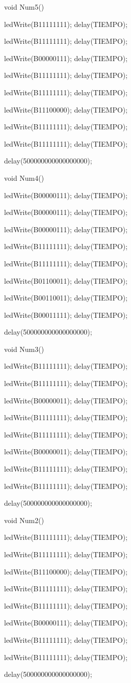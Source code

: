 \documentclass{article}
\begin{document}
void Num5(){
     
     ledWrite(B11111111); delay(TIEMPO);
   
   ledWrite(B11111111); delay(TIEMPO);
   
   ledWrite(B00000111); delay(TIEMPO);
   
   ledWrite(B11111111); delay(TIEMPO);
   
   ledWrite(B11111111); delay(TIEMPO);
   
   ledWrite(B11100000); delay(TIEMPO);
   
   ledWrite(B11111111); delay(TIEMPO);
   
   ledWrite(B11111111); delay(TIEMPO);
  
  delay(500000000000000000);}

void Num4(){
     
     ledWrite(B00000111); delay(TIEMPO);
   
   ledWrite(B00000111); delay(TIEMPO);
   
   ledWrite(B00000111); delay(TIEMPO);
   
   ledWrite(B11111111); delay(TIEMPO);
   
   ledWrite(B11111111); delay(TIEMPO);
   
   ledWrite(B01100011); delay(TIEMPO);
   
   ledWrite(B00110011); delay(TIEMPO);
   
   ledWrite(B00011111); delay(TIEMPO);
  
  delay(500000000000000000);}

void Num3(){
      
      ledWrite(B11111111); delay(TIEMPO);
   
   ledWrite(B11111111); delay(TIEMPO);
   
   ledWrite(B00000011); delay(TIEMPO);
   
   ledWrite(B11111111); delay(TIEMPO);
   
   ledWrite(B11111111); delay(TIEMPO);
   
   ledWrite(B00000011); delay(TIEMPO);
   
   ledWrite(B11111111); delay(TIEMPO);
   
   ledWrite(B11111111); delay(TIEMPO);
  
  delay(500000000000000000);}

void Num2(){
     
     ledWrite(B11111111); delay(TIEMPO);
   
   ledWrite(B11111111); delay(TIEMPO);
   
   ledWrite(B11100000); delay(TIEMPO);
   
   ledWrite(B11111111); delay(TIEMPO);
   
   ledWrite(B11111111); delay(TIEMPO);
   
   ledWrite(B00000111); delay(TIEMPO);
   
   ledWrite(B11111111); delay(TIEMPO);
   
   ledWrite(B11111111); delay(TIEMPO);
  
  delay(500000000000000000);}
\end{document}
